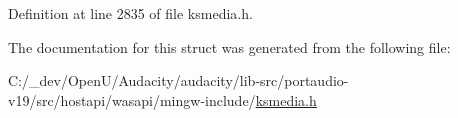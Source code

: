 Definition at line 2835 of file ksmedia.\+h.



The documentation for this struct was generated from the following file\+:\begin{DoxyCompactItemize}
\item 
C\+:/\+\_\+dev/\+Open\+U/\+Audacity/audacity/lib-\/src/portaudio-\/v19/src/hostapi/wasapi/mingw-\/include/\hyperlink{ksmedia_8h}{ksmedia.\+h}\end{DoxyCompactItemize}
